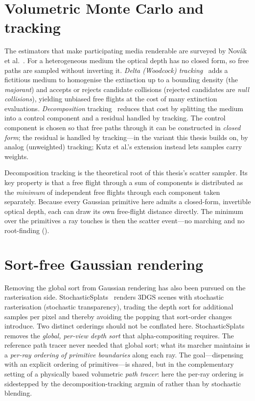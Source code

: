 \section{Volumetric Monte Carlo and tracking}
\label{sec:volumetric-mc}

The estimators that make participating media renderable are surveyed by
Nov\'ak et al.~\cite{Novak2018}. For a heterogeneous medium the optical depth has no closed form, so
free paths are sampled without inverting it. \emph{Delta (Woodcock) tracking}~\cite{Woodcock1965}
adds a fictitious medium to homogenise the extinction up to a bounding density (the
\emph{majorant}) and accepts or rejects candidate collisions (rejected candidates are
\emph{null collisions}),
yielding unbiased free flights at the cost of many extinction evaluations. \emph{Decomposition}
tracking~\cite{Kutz2017} reduces that cost by splitting the medium into a control component and a
residual handled by tracking. The control component is chosen so that free paths through it can be
constructed in \emph{closed form}; the residual is handled by tracking---in the variant
this thesis builds on, by analog (unweighted) tracking; Kutz et al.'s extension instead
lets samples carry weights.

Decomposition tracking is the theoretical root of this thesis's scatter sampler. Its key property is
that a free flight through a sum of components is distributed as the \emph{minimum} of independent
free flights through each component taken separately. Because every Gaussian primitive here admits a
closed-form, invertible optical depth, each can draw its own free-flight distance directly. The
minimum over the primitives a ray touches is then the scatter event---no marching and no
root-finding ().

\section{Sort-free Gaussian rendering}
\label{sec:sort-free}

Removing the global sort from Gaussian rendering has also been pursued on the rasterisation side.
StochasticSplats~\cite{StochasticSplats2025} renders 3DGS scenes with stochastic rasterisation
(stochastic transparency), trading the depth sort for additional samples per pixel and thereby
avoiding the popping that sort-order changes introduce. Two distinct orderings should not be
conflated here. StochasticSplats removes the \emph{global, per-view depth sort} that
alpha-compositing requires. The reference path tracer never needed that global sort; what its
marcher maintains is a \emph{per-ray ordering of primitive boundaries} along each ray. The
goal---dispensing with an explicit ordering of primitives---is shared, but in the
complementary setting of a physically based volumetric \emph{path tracer}: here the per-ray
ordering is sidestepped by the decomposition-tracking argmin of  rather than by
stochastic blending.

